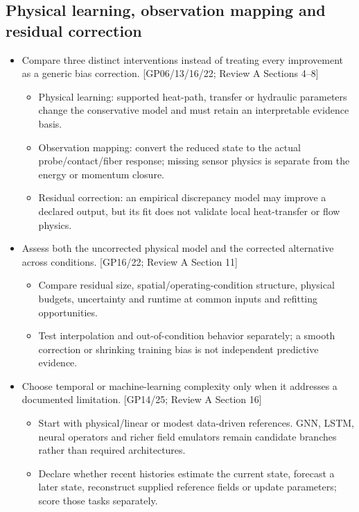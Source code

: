 \subsection{Physical learning, observation mapping and residual correction}
\begin{itemize}[leftmargin=*]
\item Compare three distinct interventions instead of treating every improvement as a generic bias correction. [GP06/13/16/22; Review A Sections 4--8]
\begin{itemize}
\item Physical learning: supported heat-path, transfer or hydraulic parameters change the conservative model and must retain an interpretable evidence basis.
\item Observation mapping: convert the reduced state to the actual probe/contact/fiber response; missing sensor physics is separate from the energy or momentum closure.
\item Residual correction: an empirical discrepancy model may improve a declared output, but its fit does not validate local heat-transfer or flow physics.
\end{itemize}
\item Assess both the uncorrected physical model and the corrected alternative across conditions. [GP16/22; Review A Section 11]
\begin{itemize}
\item Compare residual size, spatial/operating-condition structure, physical budgets, uncertainty and runtime at common inputs and refitting opportunities.
\item Test interpolation and out-of-condition behavior separately; a smooth correction or shrinking training bias is not independent predictive evidence.
\end{itemize}
\item Choose temporal or machine-learning complexity only when it addresses a documented limitation. [GP14/25; Review A Section 16]
\begin{itemize}
\item Start with physical/linear or modest data-driven references. GNN, LSTM, neural operators and richer field emulators remain candidate branches rather than required architectures.
\item Declare whether recent histories estimate the current state, forecast a later state, reconstruct supplied reference fields or update parameters; score those tasks separately.
\end{itemize}
\end{itemize}
